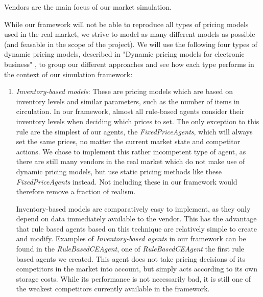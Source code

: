 Vendors are the main focus of our market simulation.

While our framework will not be able to reproduce all types of pricing models used in the real market, we strive to model as many different models as possible (and feasable in the scope of the project). We will use the following four types of dynamic pricing models, described in "Dynamic pricing models for electronic business" \cite{dynamicPricingModels}, to group our different approaches and see how each type performs in the context of our simulation framework:

\begin{enumerate}
	\item \emph{Inventory-based models}: These are pricing models which are based on inventory levels and similar parameters, such as the number of items in circulation. In our framework, almost all rule-based agents consider their inventory levels when deciding which prices to set. The only exception to this rule are the simplest of our agents, the \emph{FixedPriceAgents}, which will always set the same prices, no matter the current market state and competitor actions. We chose to implement this rather incompetent type of agent, as there are still many vendors in the real market which do not make use of dynamic pricing models, but use static pricing methods like these \emph{FixedPriceAgents} instead. Not including these in our framework would therefore remove a fraction of realism.

	Inventory-based models are comparatively easy to implement, as they only depend on data immediately available to the vendor. This has the advantage that rule based agents based on this technique are relatively simple to create and modify. Examples of \emph{Inventory-based agents} in our framework can be found in the \emph{RuleBasedCEAgent}, one of \emph{RuleBasedCEAgent} the first rule based agents we created. This agent does not take pricing decisions of its competitors in the market into account, but simply acts according to its own storage costs. While its performance is not necessarily bad, it is still one of the weakest competitors currently available in the framework. 


\end{enumerate}
